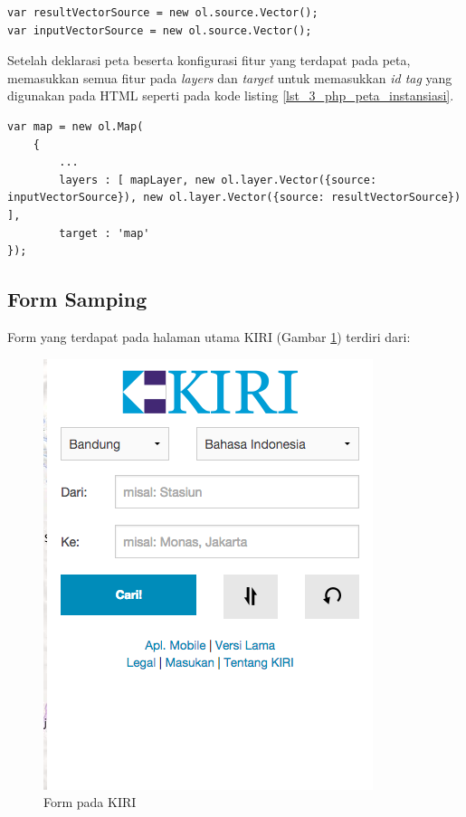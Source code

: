 \begin{lstlisting}[caption=Objek ol.source.Vector,label = {lst_3_php_peta_olvector}]
var resultVectorSource = new ol.source.Vector();
var inputVectorSource = new ol.source.Vector();
\end{lstlisting}

Setelah deklarasi peta beserta konfigurasi fitur yang terdapat pada peta, memasukkan semua fitur pada \textit{layers} dan \textit{target} untuk memasukkan \textit{id tag} yang digunakan pada HTML seperti pada kode listing \ref{lst_3_php_peta_instansiasi}.

\begin{lstlisting}[caption=Instansiasi peta,label = {lst_3_php_peta_instansiasi}]
var map = new ol.Map(
	{
		...
		layers : [ mapLayer, new ol.layer.Vector({source: inputVectorSource}), new ol.layer.Vector({source: resultVectorSource}) ],
		target : 'map'
});
\end{lstlisting}

\subsection{Form Samping}
Form yang terdapat pada halaman utama KIRI (Gambar \ref{fig:3_KIRI_form}) terdiri dari:
\begin{figure}[H]
	\centering
	\includegraphics[scale=0.5]{Gambar/KIRI-form}
	\caption{Form pada KIRI} 
	\label{fig:3_KIRI_form}
\end{figure}

